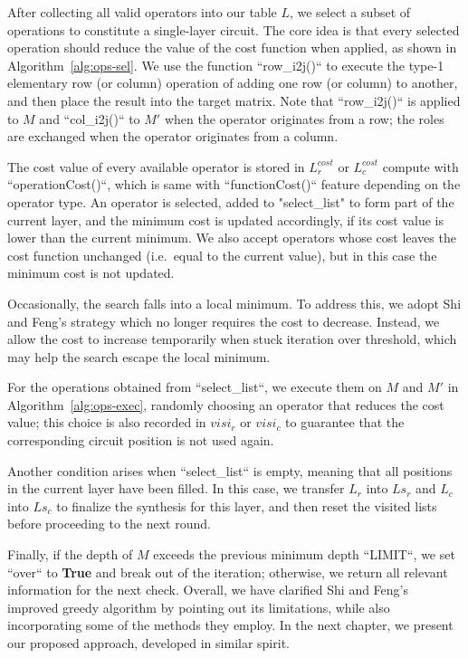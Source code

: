After collecting all valid operators into our table $L$, we 
select a subset of operations to constitute a single-layer circuit. 
The core idea is that every selected operation should reduce the 
value of the cost function when applied, as shown in Algorithm~\ref{alg:ops-sel}. 
We use the function ``row\_i2j()`` to execute the type-1 elementary row 
(or column) operation of adding one row (or column) to another, 
and then place the result into the target matrix. Note that 
``row\_i2j()`` is applied to $M$ and ``col\_i2j()`` to $M'$ when the operator 
originates from a row; the roles are exchanged when the operator 
originates from a column.

The cost value of every available operator is stored in 
$L_{r}^{cost}$ or $L_{c}^{cost}$ compute with ``operationCost()``, 
which is same with ``functionCost()`` feature depending on the operator 
type. An operator is selected, added to "select\_list" to form 
part of the current layer, and the minimum cost is updated accordingly, 
if its cost value is lower than the current minimum. We also accept 
operators whose cost leaves the cost function unchanged 
(i.e.\ equal to the current value), but in this case the 
minimum cost is not updated.

Occasionally, the search falls into a local minimum. To address 
this, we adopt Shi and Feng's strategy which no longer requires 
the cost to decrease. Instead, we allow the cost to increase temporarily 
when stuck iteration over threshold, which may help the search 
escape the local minimum.

For the operations obtained from ``select\_list``, we execute them on 
$M$ and $M'$ in Algorithm~\ref{alg:ops-exec}, randomly choosing an 
operator that reduces the cost value; this choice is also recorded 
in $visi_{r}$ or $visi_{c}$ to guarantee that the corresponding 
circuit position is not used again.

Another condition arises when ``select\_list`` is empty, meaning that
all positions in the current layer have been filled. In this case, we
transfer $L_r$ into $Ls_r$ and $L_c$ into $Ls_c$ to finalize the synthesis
for this layer, and then reset the visited lists before proceeding to the
next round.

Finally, if the depth of $M$ exceeds the previous minimum depth
``LIMIT``, we set ``over`` to \textbf{True} and break out of the
iteration; otherwise, we return all relevant information for the next
check. Overall, we have clarified Shi and Feng's improved greedy algorithm
by pointing out its limitations, while also incorporating some of the
methods they employ. In the next chapter, we present our proposed
approach, developed in similar spirit.

